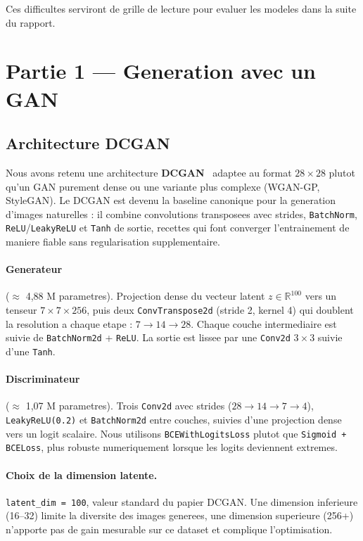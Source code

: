 Ces difficultes serviront de grille de lecture pour evaluer les modeles dans la suite du rapport.

\section{Partie 1 --- Generation avec un GAN}
\label{sec:gan}

\subsection{Architecture DCGAN}

Nous avons retenu une architecture \textbf{DCGAN}~\cite{radford2015dcgan} adaptee au format $28 \times 28$ plutot qu'un GAN purement dense ou une variante plus complexe (WGAN-GP, StyleGAN). Le DCGAN est devenu la baseline canonique pour la generation d'images naturelles : il combine convolutions transposees avec strides, \texttt{BatchNorm}, \texttt{ReLU}/\texttt{LeakyReLU} et \texttt{Tanh} de sortie, recettes qui font converger l'entrainement de maniere fiable sans regularisation supplementaire.

\paragraph{Generateur} ($\approx$ 4{,}88 M parametres). Projection dense du vecteur latent $z \in \mathbb{R}^{100}$ vers un tenseur $7 \times 7 \times 256$, puis deux \texttt{ConvTranspose2d} (stride 2, kernel 4) qui doublent la resolution a chaque etape : $7 \to 14 \to 28$. Chaque couche intermediaire est suivie de \texttt{BatchNorm2d} + \texttt{ReLU}. La sortie est lissee par une \texttt{Conv2d} $3 \times 3$ suivie d'une \texttt{Tanh}.

\paragraph{Discriminateur} ($\approx$ 1{,}07 M parametres). Trois \texttt{Conv2d} avec strides ($28 \to 14 \to 7 \to 4$), \texttt{LeakyReLU(0.2)} et \texttt{BatchNorm2d} entre couches, suivies d'une projection dense vers un logit scalaire. Nous utilisons \texttt{BCEWithLogitsLoss} plutot que \texttt{Sigmoid + BCELoss}, plus robuste numeriquement lorsque les logits deviennent extremes.

\paragraph{Choix de la dimension latente.} \texttt{latent\_dim = 100}, valeur standard du papier DCGAN. Une dimension inferieure (16--32) limite la diversite des images generees, une dimension superieure (256+) n'apporte pas de gain mesurable sur ce dataset et complique l'optimisation.

